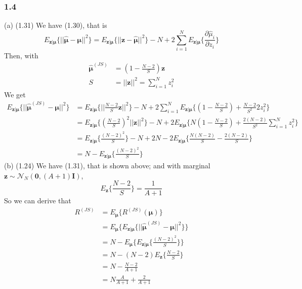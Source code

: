 \documentclass{article}
\begin{document}
\subsubsection*{1.4}
(a) (1.31) \newline
We have (1.30), that is
\begin{displaymath}
E_{\bm{z|\mu}} \{||\hat{\bm{\mu}} - \bm{\mu}||^2\} 
= E_{\bm{z|\mu}} \{||\bm{z} - \hat{\bm{\mu}}||^2\} - N 
+ 2\sum_{i=1}^N E_{\bm{z|\mu}}\{\frac{\partial \hat{\mu}_i}{\partial z_i}\}
\end{displaymath}
Then, with 
\begin{displaymath}
\begin{split}
\hat{\bm{\mu}}^{(JS)} &= (1 - \frac{N-2}{S}) \bm{z} \\
S &=||\bm{z}||^2= \sum_{i=1}^N z_i^2
\end{split}
\end{displaymath}
We get
\begin{displaymath}
\begin{split}
E_{\bm{z|\mu}} \{||\hat{\bm{\mu}}^{(JS)} - \bm{\mu}||^2\} 
& =  E_{\bm{z|\mu}} \{||\frac{N-2}{S} \bm{z}||^2\} - N + 2\sum_{i=1}^N
E_{\bm{z|\mu}} \{(1-\frac{N-2}{S}) + \frac{N-2}{S^2} 2z_i^2 \}  \\
& = E_{\bm{z|\mu}} \{(\frac{N-2}{S})^2 ||\bm{z}||^2\} - N + 
2 E_{\bm{z|\mu}} \{N(1-\frac{N-2}{S}) + \frac{2(N-2)}{S^2} \sum_{i=1}^N z_i^2\} \\
& = E_{\bm{z|\mu}} \{\frac{(N-2)^2}{S} \} - N + 2N -
2 E_{\bm{z|\mu}} \{\frac{N(N-2)}{S} - \frac{2(N-2)}{S} \} \\
& = N - E_{\bm{z|\mu}} \{\frac{(N-2)^2}{S} \}
\end{split}
\end{displaymath}
(b) (1.24) \newline
We have (1.31), that is shown above; and with marginal 
$\bm{z} \sim \mathcal{N}_N(\bm{0},(A+1)\bm{I})$, 
\begin{displaymath}
E_{\bm{z}} \{ \frac{N-2}{S} \} = \frac{1}{A+1}
\end{displaymath}
So we can derive that
\begin{displaymath}
\begin{split}
R^{(JS)} & = E_{\bm{\mu}} \{ R^{(JS)} (\bm{\mu}) \} \\
& = E_{\bm{\mu}} \{ E_{\bm{z|\mu}} \{||\hat{\bm{\mu}}^{(JS)} - \bm{\mu}||^2\} \} \\
& = N - E_{\bm{\mu}} \{ E_{\bm{z|\mu}} \{ \frac{(N-2)^2}{S} \} \} \\
& = N - (N-2) E_{\bm{z}} \{ \frac{N-2}{S} \} \\
& = N - \frac{N-2}{A+1}  \\
& = N \frac{A}{A+1} + \frac{2}{A+1}
\end{split}
\end{displaymath}
\end{document}

